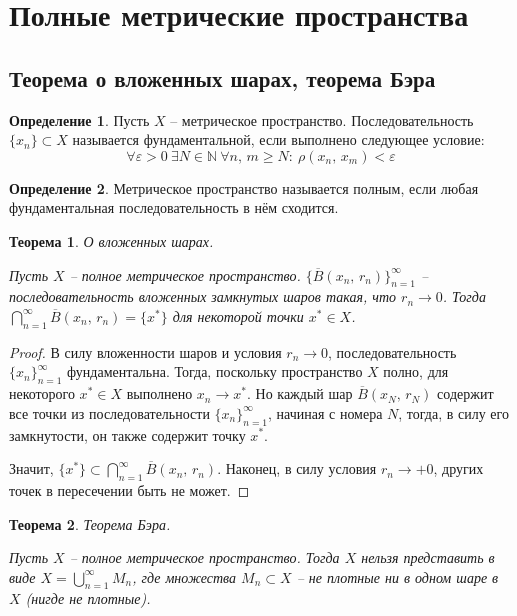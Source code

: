 \documentclass[a4paper,12pt]{article}
\renewcommand{\geq}{\ensuremath{\geqslant}}
\theoremstyle{plain}
\newtheorem{theorem}{Теорема}[section]
\theoremstyle{definition}
\newtheorem{definition}{Определение}[section]
\theoremstyle{remark}
\begin{document}
\section{Полные метрические пространства}
\subsection{Теорема о вложенных шарах, теорема Бэра}
\begin{definition}
	Пусть $X$ -- метрическое пространство. Последовательность $\{x_n\} \subset X$ называется фундаментальной, если выполнено следующее условие:
	\[
		\forall \varepsilon > 0 \: \exists N \in \mathbb{N} \: \forall n,\,m \geq N :\: \rho(x_n,\, x_m) < \varepsilon
	\]
\end{definition}

\begin{definition}
	Метрическое пространство называется полным, если любая фундаментальная последовательность в нём сходится.
\end{definition}

\begin{theorem}
	О вложенных шарах.

	Пусть $X$ -- полное метрическое пространство. $\{\overline{B}(x_n,\, r_n)\}_{n = 1}^\infty$ -- последовательность вложенных замкнутых шаров такая, что $r_n \to 0$. Тогда $\bigcap_{n = 1}^\infty \overline{B}(x_n,\, r_n) = \{x^*\}$ для некоторой точки $x^* \in X$.
\end{theorem}

\begin{proof}
	В силу вложенности шаров и условия $r_n \to 0$, последовательность $\{x_n\}_{n=1}^\infty$ фундаментальна. Тогда, поскольку пространство $X$ полно, для некоторого $x^* \in X$ выполнено $x_n \to x^*$. Но каждый шар $\overline{B}(x_N,\, r_N)$ содержит все точки из последовательности $\{x_n\}_{n = 1}^\infty$, начиная с номера $N$, тогда, в силу его замкнутости, он также содержит точку $x^*$.

	Значит, $\{x^*\} \subset \bigcap_{n = 1}^\infty \overline{B}(x_n,\, r_n)$. Наконец, в силу условия $r_n \to +0$, других точек в пересечении быть не может.
\end{proof}

\begin{theorem}
	Теорема Бэра.

	Пусть $X$ -- полное метрическое пространство. Тогда $X$ нельзя представить в виде $X = \bigcup_{n = 1}^\infty M_n$, где множества $M_n \subset X$ -- не плотные ни в одном шаре в $X$ (нигде не плотные).
\end{theorem}
\end{document}
